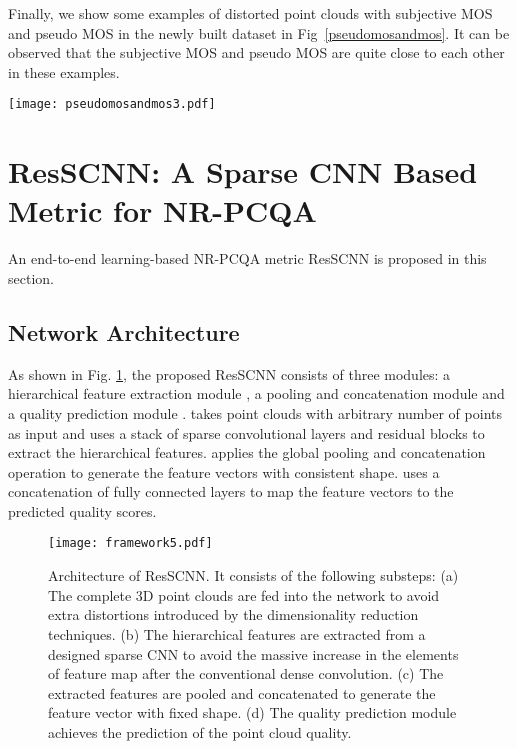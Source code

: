 \documentclass[acmsmall]{acmart}
\begin{document}
\par Finally, we show some examples of distorted point clouds with subjective MOS and pseudo MOS in the newly built dataset in Fig~\ref{pseudomosandmos}. It can be observed that the subjective MOS and pseudo MOS are quite close to each other in these examples.

\begin{figure*}[htbp]
	\centering
	\texttt{[image: pseudomosandmos3.pdf]}
	\caption{Selected point clouds with their subjective MOS and pseudo MOS. The associated subjective MOS and pseudo MOS are consistent.}
	\label{pseudomosandmos}

\end{figure*}


\section{ResSCNN: A Sparse CNN Based Metric for NR-PCQA}\label{sec:framework}

\par An end-to-end learning-based NR-PCQA metric ResSCNN is proposed in this section.

\subsection{Network Architecture}

\par As shown in Fig. \ref{framework}, the proposed ResSCNN consists of three modules: a hierarchical feature extraction module , a pooling and concatenation module  and a quality prediction module .
 takes point clouds with arbitrary number of points as input and uses a stack of sparse convolutional layers and residual blocks to extract the hierarchical features.  applies the global pooling and concatenation operation to generate the feature vectors with consistent shape.  uses a concatenation of fully connected layers to map the feature vectors to the predicted quality scores.

\begin{figure}[htbp]
	\centering
	\texttt{[image: framework5.pdf]}
	\caption{Architecture of ResSCNN. It consists of the following substeps: (a) The complete 3D point clouds are fed into the network to avoid extra distortions introduced by the dimensionality reduction techniques. (b) The hierarchical features are extracted from a designed sparse CNN to avoid the massive increase in the elements of feature map after the conventional dense convolution. (c) The extracted features are pooled and concatenated to generate the feature vector with fixed shape. (d) The quality prediction module achieves the prediction of the point cloud quality.}
	\label{framework}

\end{figure}
\end{document}
